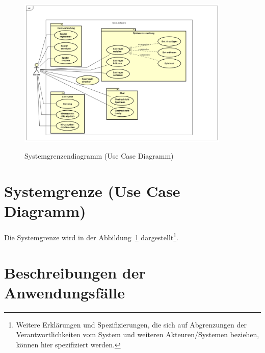 \begin{figure}
\centering	
\includegraphics[width=0.9\textwidth]{img/ucd.png}
\label{fig:sys}
\caption{Systemgrenzendiagramm (Use Case Diagramm)}
\end{figure}

\section{Systemgrenze (Use Case Diagramm)}

Die Systemgrenze wird in der Abbildung~\ref{fig:sys} dargestellt\footnote{Weitere Erklärungen und Spezifizierungen, die sich auf Abgrenzungen der Verantwortlichkeiten vom System und weiteren Akteuren/Systemen beziehen, können hier spezifiziert werden.}. 


\section{Beschreibungen der Anwendungsfälle}

\setcounter{uc}{10}

